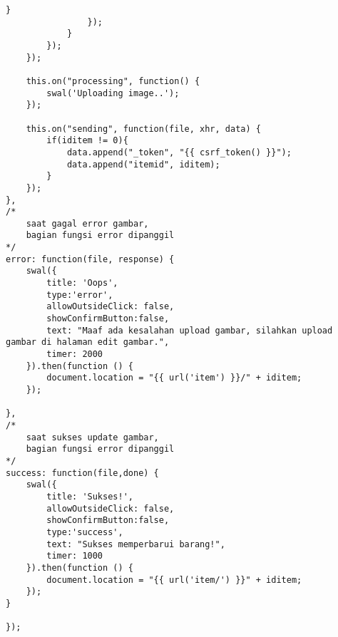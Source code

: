 \begin{lstlisting}[label=cdjq.03-02,style=htmlcssjs,caption=Kode Sumber \textit{View} Memperbarui Barang]
	                }
	            });
	        }
	    });
	});

	this.on("processing", function() {
	    swal('Uploading image..');
	});

	this.on("sending", function(file, xhr, data) {
	    if(iditem != 0){
	        data.append("_token", "{{ csrf_token() }}");
	        data.append("itemid", iditem);
	    }
	});
},
/*	
	saat gagal error gambar,
	bagian fungsi error dipanggil
*/
error: function(file, response) {
    swal({
        title: 'Oops',
        type:'error',
        allowOutsideClick: false,
        showConfirmButton:false,
        text: "Maaf ada kesalahan upload gambar, silahkan upload gambar di halaman edit gambar.",
        timer: 2000
    }).then(function () {
        document.location = "{{ url('item') }}/" + iditem;
    });

},
/*	
	saat sukses update gambar,
	bagian fungsi error dipanggil
*/
success: function(file,done) {
    swal({
        title: 'Sukses!',
        allowOutsideClick: false,
        showConfirmButton:false,
        type:'success',
        text: "Sukses memperbarui barang!",
        timer: 1000
    }).then(function () {
        document.location = "{{ url('item/') }}" + iditem;
    });
}

});

\end{lstlisting}


